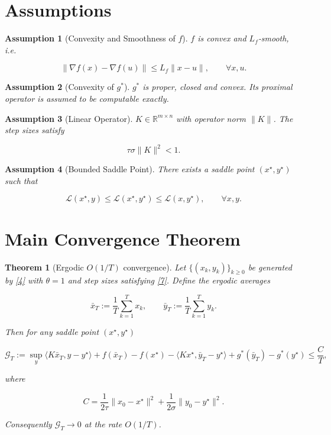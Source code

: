 \documentclass{article}
\newtheorem{theorem}{Theorem}
\newtheorem{assumption}{Assumption}
\begin{document}
\section*{Assumptions}
\begin{assumption}[Convexity and Smoothness of $f$]\label{ass:f}
$f$ is convex and $L_{f}$‑smooth, i.e.  

\[
\|\nabla f(x)-\nabla f(u)\|\le L_{f}\|x-u\|,\qquad\forall x,u.
\tag{6}
\]
\end{assumption}

\begin{assumption}[Convexity of $g^{*}$]\label{ass:g}
$g^{*}$ is proper, closed and convex. Its proximal operator is assumed to be
computable exactly.
\end{assumption}

\begin{assumption}[Linear Operator]\label{ass:K}
$K\in\mathbb R^{m\times n}$ with operator norm $\|K\|$. The step sizes satisfy  

\[
\tau\sigma\|K\|^{2}<1 .
\tag{7}
\]

\end{assumption}

\begin{assumption}[Bounded Saddle Point]\label{ass:sol}
There exists a saddle point $(x^{\star},y^{\star})$ such that  

\[
\mathcal L(x^{\star},y)\le \mathcal L(x^{\star},y^{\star})\le \mathcal L(x,y^{\star}),
\qquad\forall x,y .
\tag{8}
\]

\end{assumption}

\section*{Main Convergence Theorem}
\begin{theorem}[Ergodic $O(1/T)$ convergence]\label{thm:main}
Let $\{(x_{k},y_{k})\}_{k\ge0}$ be generated by \eqref{4} with $\theta=1$ and
step sizes satisfying \eqref{7}. Define the ergodic averages  

\[
\bar x_{T}:=\frac{1}{T}\sum_{k=1}^{T}x_{k},\qquad 
\bar y_{T}:=\frac{1}{T}\sum_{k=1}^{T}y_{k}.
\]

Then for any saddle point $(x^{\star},y^{\star})$  

\[
\mathcal G_{T}:=
\sup_{y}\bigl\langle K\bar x_{T},y-y^{\star}\bigr\rangle
   +f(\bar x_{T})-f(x^{\star})
   -\bigl\langle Kx^{\star},\bar y_{T}-y^{\star}\bigr\rangle
   +g^{*}(\bar y_{T})-g^{*}(y^{\star})
\le
\frac{C}{T},
\tag{9}
\]

where  

\[
C=
\frac{1}{2\tau}\|x_{0}-x^{\star}\|^{2}
+\frac{1}{2\sigma}\|y_{0}-y^{\star}\|^{2}.
\tag{10}
\]

Consequently $\mathcal G_{T}\to0$ at the rate $O(1/T)$.
\end{theorem}
\end{document}
